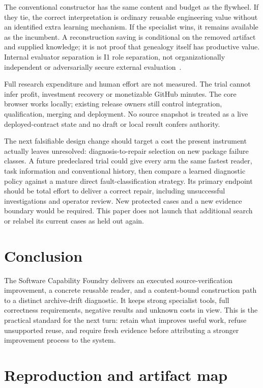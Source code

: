 \documentclass[11pt,a4paper]{article}
\begin{document}
The conventional constructor has the same content and budget as the flywheel. If they tie, the correct interpretation is ordinary reusable engineering value without an identified extra learning mechanism. If the specialist wins, it remains available as the incumbent. A reconstruction saving is conditional on the removed artifact and supplied knowledge; it is not proof that genealogy itself has productive value. Internal evaluator separation is I1 role separation, not organizationally independent or adversarially secure external evaluation~\cite[PDF p.~28]{neural_symbolic_v1}.

Full research expenditure and human effort are not measured. The trial cannot infer profit, investment recovery or monetizable GitHub minutes. The core browser works locally; existing release owners still control integration, qualification, merging and deployment. No source snapshot is treated as a live deployed-contract state and no draft or local result confers authority.

The next falsifiable design change should target a cost the present instrument actually leaves unresolved: diagnosis-to-repair selection on new package failure classes. A future predeclared trial could give every arm the same fastest reader, task information and conventional history, then compare a learned diagnostic policy against a mature direct fault-classification strategy. Its primary endpoint should be total effort to deliver a correct repair, including unsuccessful investigations and operator review. New protected cases and a new evidence boundary would be required. This paper does not launch that additional search or relabel its current cases as held out again.

\section{Conclusion}

The Software Capability Foundry delivers an executed source-verification improvement, a concrete reusable reader, and a content-bound construction path to a distinct archive-drift diagnostic. It keeps strong specialist tools, full correctness requirements, negative results and unknown costs in view. \ConclusionResult{} This is the practical standard for the next turn: retain what improves useful work, refuse unsupported reuse, and require fresh evidence before attributing a stronger improvement process to the system.

\appendix
\section{Reproduction and artifact map}
\end{document}
